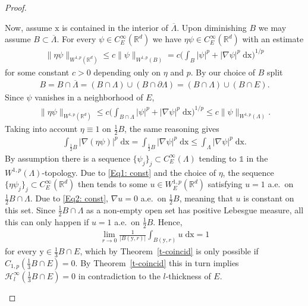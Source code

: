 \documentclass[10pt,leqno]{amsart}
\theoremstyle{definition}
\numberwithin{equation}{section}
\begin{document}
\begin{proof}
\begin{enumerate}
	Now, assume ${{\mathrm x}}$ is contained in the interior of $\overline{\Lambda}$.
	Upon diminishing $B$ we may assume $B \subset \overline{\Lambda}$. For
	every $\psi \in C_E^\infty({{\mathbb R}}^d)$ we have $\eta \psi \in
	C_E^\infty({{\mathbb R}}^d)$ with an estimate
	\begin{align*}
	\|\eta \psi\|_{W^{1,p}({{\mathbb R}}^d)} \leq c \|\psi\|_{W^{1,p}(B)} 
	= c \Big(\int_B |\psi|^p + |\nabla \psi|^p \; {{\mathrm d}}
	  {{\mathrm x}}\Big)^{1/p}
	\end{align*}
	for some constant $c>0$ depending only on $\eta$ and $p$. By our choice
	of $B$ split
	\begin{align*}
	 B = B \cap \overline{\Lambda} 
	    = (B \cap \Lambda)\cup (B \cap \partial \Lambda) 
	    = (B \cap \Lambda)\cup (B \cap E).
	\end{align*}
	Since $\psi$ vanishes in a neighborhood of $E$,
	\begin{align}
	\label{Eq1: const}
	\|\eta \psi\|_{W^{1,p}({{\mathbb R}}^d)} 
	\leq c \Big(\int_{B \cap \Lambda} |\psi|^p + |\nabla \psi|^p \; {{\mathrm d}}
	  {{\mathrm x}}\Big)^{1/p}
	\leq c\|\psi\|_{W^{1,p}(\Lambda)}.
	\end{align}
	Taking into account $\eta \equiv 1$ on $\frac{1}{2}B$, the same
	reasoning gives
	\begin{align}
	\label{Eq2: const}
	\int_{\frac{1}{2} B} |\nabla (\eta \psi)|^p \; {{\mathrm d}} {{\mathrm x}}
	= \int_{\frac{1}{2} B} |\nabla \psi|^p \; {{\mathrm d}} {{\mathrm x}}
	\leq \int_\Lambda |\nabla \psi|^p \; {{\mathrm d}} {{\mathrm x}}.
	\end{align}
	By assumption there is a sequence $\{\psi_j\}_j \subset
	C_E^\infty(\Lambda)$ tending to $\mathds{1}$
	in the $W^{1,p}(\Lambda)$-topology. Due to \eqref{Eq1: const} and the
	choice of $\eta$, the sequence $\{\eta \psi_j\}_j
	\subset C_E^\infty({{\mathbb R}}^d)$ then tends to some $u \in W_E^{1,p}({{\mathbb R}}^d)$
	satisfying $u = 1$ a.e.\ on $\frac{1}{2}B \cap \Lambda$. Due to
	\eqref{Eq2: const}, $\nabla u = 0$ a.e.\ on $\frac{1}{2}B$, meaning that
	$u$ is constant on this set. Since $\frac{1}{2}B \cap \Lambda$ as a
	non-empty open set has positive Lebesgue measure, all this can only
	happen if $u = 1$ a.e.\ on $\frac{1}{2}B$. Hence,
	\begin{align*}
	 \lim_{r \to 0} \frac{1}{|B({{\mathrm y}},r)|} \int_{B({{\mathrm y}},r)} u \; {{\mathrm d}} {{\mathrm x}} = 1
	\end{align*}
	for every ${{\mathrm y}} \in \frac{1}{3} B \cap E$, which by
	Theorem~\ref{t-coincid} is only possible if $C_{1,p}(\frac{1}{3} B \cap
	E) = 0$. By Theorem~\ref{t-coincid} this in turn implies
	${\mathcal{H}}_l^\infty(\frac{1}{3} B \cap E) = 0$	in contradiction to the
	$l$-thickness of $E$.


\end{enumerate}
\end{proof}
\end{document}
